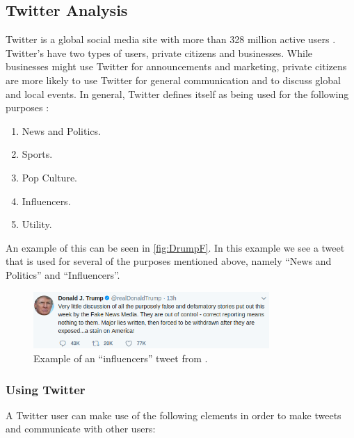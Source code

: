 \subsection{Twitter Analysis}\label{sec:twitter-analysis}
Twitter is a global social media site with more than 328 million active users
\citep{SocialMediaStats}. Twitter's have two types of users, private citizens
and businesses. While businesses might use Twitter for announcements and
marketing, private citizens are more likely to use Twitter for general
communication and to discuss global and local events. In general, Twitter
defines itself as being used for the following purposes \citep{StartingTwitter}:

\begin{enumerate}    
  \item News and Politics.
  \item Sports.
  \item Pop Culture. 
  \item Influencers.
  \item Utility.
\end{enumerate} 

An example of this can be seen in \autoref{fig:DrumpF}. In this example we see
a tweet that is used for several of the purposes mentioned above, namely ``News
and Politics'' and ``Influencers''.

\begin{figure}[H] 
	\centering 
	\includegraphics[width = 0.8\textwidth]{figures/DonDrumpf.png}
	\caption{Example of an ``influencers'' tweet from \@realDonaldTrump.}
	\label{fig:DrumpF}
\end{figure}

\subsubsection{Using Twitter}
A Twitter user can make use of the following elements \citep{StartingTwitter}
in order to make tweets and communicate with other users:


